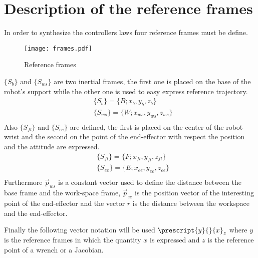 \section{Description of the reference frames}
In order to synthesize the controllers laws four reference frames must be define.
\begin{figure}[h]
  \centering
  \texttt{[image: frames.pdf]}
  \caption{Reference frames}
\end{figure}
$\{S_{b}\}$ and $\{S_{ws}\}$ are two inertial frames, the first one is placed on the base of the robot's support while the other one is used to easy express reference trajectory.
\[
\begin{split}
  &\{S_b\} = \{B; x_b, y_b, z_b \}\\
  &\{S_{ws}\} = \{W; x_{ws}, y_{ws}, z_{ws} \}\\
\end{split}
\]
Also $\{S_{fl}\}$ and $\{S_{ee}\}$ are defined, the first is placed on the center of the robot wrist and the second on the point of the end-effector with respect the position and the attitude are expressed.
\[
\begin{split}
  &\{S_{fl}\} = \{F; x_{fl}, y_{fl}, z_{fl} \}\\
  &\{S_{ee}\} = \{E; x_{ee}, y_{ee}, z_{ee} \}\\
\end{split}
\]
Furthermore $\vec{p}_{ws}$ is a constant vector used to define the distance between the base frame and the work-space frame, $\vec{p}_{ee}$ is the position vector of the interesting point of the end-effector and the vector $r$ is the distance between the workspace and the end-effector.

Finally the following vector notation will be used $\prescript{y}{}{x}_z$ where $y$ is the reference frames in which the quantity $x$ is expressed and $z$ is the reference point of a wrench or a Jacobian.
